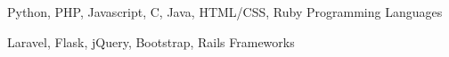 

\begin{cventries}

  \cventry %
    {
        Python,
        PHP,
        Javascript,
        C,
        Java,
        HTML/CSS,
        Ruby
    } 
    {Programming Languages} %
    {} %
    {} %
    {}

  \cventry %
    {
        Laravel,
        Flask,
        jQuery,
        Bootstrap,
        Rails
    }
    {Frameworks} %
    {} %
    {} %
    {}

\end{cventries}
